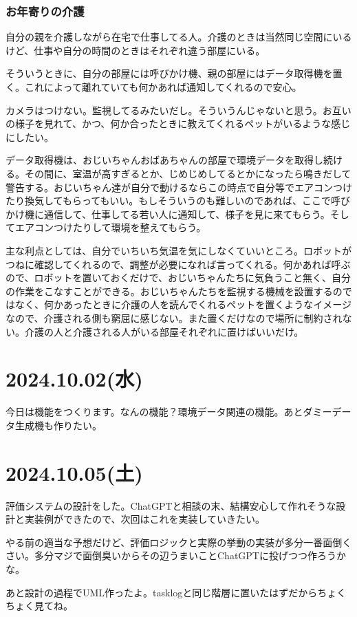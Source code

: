 \documentclass[fleqn,twocolumn]{mynote}
\begin{document}
\subsubsection*{お年寄りの介護}
自分の親を介護しながら在宅で仕事してる人。介護のときは当然同じ空間にいるけど、仕事や自分の時間のときはそれぞれ違う部屋にいる。

そういうときに、自分の部屋には呼びかけ機、親の部屋にはデータ取得機を置く。これによって離れていても何かあれば通知してくれるので安心。

カメラはつけない。監視してるみたいだし。そういうんじゃないと思う。お互いの様子を見れて、かつ、何か合ったときに教えてくれるペットがいるような感じにしたい。

データ取得機は、おじいちゃんおばあちゃんの部屋で環境データを取得し続ける。その間に、室温が高すぎるとか、じめじめしてるとかになったら鳴きだして警告する。おじいちゃん達が自分で動けるならこの時点で自分等でエアコンつけたり換気してもらってもいい。もしそういうのも難しいのであれば、ここで呼びかけ機に通信して、仕事してる若い人に通知して、様子を見に来てもらう。そしてエアコンつけたりして環境を整えてもらう。

主な利点としては、自分でいちいち気温を気にしなくていいところ。ロボットがつねに確認してくれるので、調整が必要になれば言ってくれる。何かあれば呼ぶので、ロボットを置いておくだけで、おじいちゃんたちに気負うこと無く、自分の作業をこなすことができる。おじいちゃんたちを監視する機械を設置するのではなく、何かあったときに介護の人を読んでくれるペットを置くようなイメージなので、介護される側も窮屈に感じない。また置くだけなので場所に制約されない。介護の人と介護される人がいる部屋それぞれに置けばいいだけ。

\section*{2024.10.02(水)}
今日は機能をつくります。なんの機能？環境データ関連の機能。あとダミーデータ生成機も作りたい。

\section*{2024.10.05(土)}
評価システムの設計をした。ChatGPTと相談の末、結構安心して作れそうな設計と実装例ができたので、次回はこれを実装していきたい。

やる前の適当な予想だけど、評価ロジックと実際の挙動の実装が多分一番面倒くさい。多分マジで面倒臭いからその辺うまいことChatGPTに投げつつ作ろうかな。

あと設計の過程でUML作ったよ。tasklogと同じ階層に置いたはずだからちょくちょく見てね。
\end{document}
